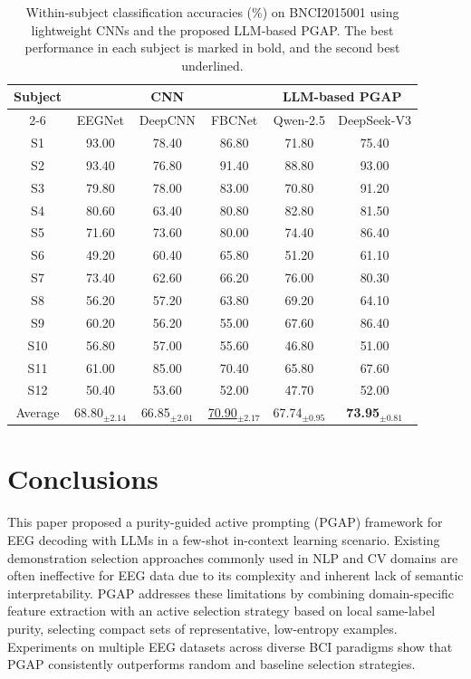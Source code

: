 \documentclass[journal,twocolumn]{IEEEtran}
\begin{document}
\begin{table}[htpb] \centering
\setlength{\tabcolsep}{1mm}
\renewcommand\arraystretch{1}
\caption{Within-subject classification accuracies (\%) on BNCI2015001 using lightweight CNNs and the proposed LLM-based PGAP. The best performance in each subject is marked in bold, and the second best underlined.}
\label{tab:deepseek-result}
\begin{tabular}{c|ccc|cc}
\toprule
\multirow{2.5}{*}{Subject} & \multicolumn{3}{c|}{CNN} & \multicolumn{2}{c}{LLM-based PGAP} \\ \cmidrule(lr){2-6}
 & EEGNet & DeepCNN & FBCNet & Qwen-2.5 & DeepSeek-V3 \\
\midrule
S1  & 93.00 & 78.40 & 86.80 & 71.80 & 75.40 \\
S2  & 93.40 & 76.80 & 91.40 & 88.80 & 93.00 \\
S3  & 79.80 & 78.00 & 83.00 & 70.80 & 91.20 \\
S4  & 80.60 & 63.40 & 80.80 & 82.80 & 81.50 \\
S5  & 71.60 & 73.60 & 80.00 & 74.40 & 86.40 \\
S6  & 49.20 & 60.40 & 65.80 & 51.20 & 61.10 \\
S7  & 73.40 & 62.60 & 66.20 & 76.00 & 80.30 \\
S8  & 56.20 & 57.20 & 63.80 & 69.20 & 64.10 \\
S9  & 60.20 & 56.20 & 55.00 & 67.60 & 86.40 \\
S10 & 56.80 & 57.00 & 55.60 & 46.80 & 51.00 \\
S11 & 61.00 & 85.00 & 70.40 & 65.80 & 67.60 \\
S12 & 50.40 & 53.60 & 52.00 & 47.70 & 52.00 \\
\midrule
Average & 68.80$_{\pm2.14}$ & 66.85$_{\pm2.01}$ & \underline{70.90}$_{\pm2.17}$ & 67.74$_{\pm0.95}$ & \textbf{73.95}$_{\pm0.81}$ \\
\bottomrule
\end{tabular}
\end{table}

\section{Conclusions}\label{sec:conclusion}
This paper proposed a purity-guided active prompting (PGAP) framework for EEG decoding with LLMs in a few-shot in-context learning scenario. Existing demonstration selection approaches commonly used in NLP and CV domains are often ineffective for EEG data due to its complexity and inherent lack of semantic interpretability. PGAP addresses these limitations by combining domain-specific feature extraction with an active selection strategy based on local same-label purity, selecting compact sets of representative, low-entropy examples. Experiments on multiple EEG datasets across diverse BCI paradigms show that PGAP consistently outperforms random and baseline selection strategies.


\end{document}

